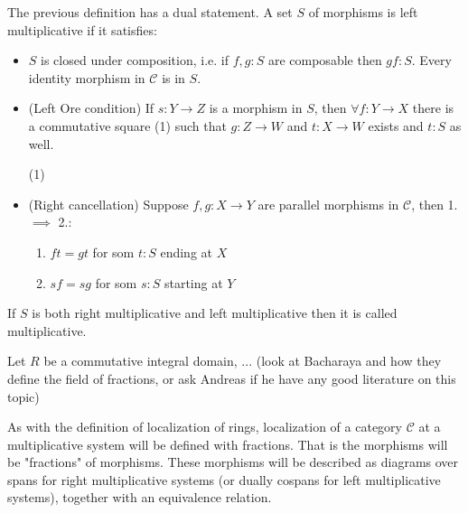     \begin{remark}
        The previous definition has a dual statement. A set $S$ of morphisms is left multiplicative if it satisfies:
        \begin{itemize}
            \item $S$ is closed under composition, i.e. if $f,g : S$ are composable then $gf : S$. Every identity morphism in $\mathcal{C}$ is in $S$.
            \item (Left Ore condition) If $s : Y \rightarrow Z$ is a morphism in $S$, then $\forall f:Y\rightarrow X$ there is a commutative square (1) such that $g:Z\rightarrow W$ and $t:X\rightarrow W$ exists and $t:S$ as well.
            \begin{center}
                (1)
            \end{center}
            \item (Right cancellation) Suppose $f,g:X\rightarrow Y$ are parallel morphisms in $\mathcal{C}$, then 1. $\implies$ 2.:
            \begin{enumerate}
                \item $ft = gt$ for som $t:S$ ending at $X$
                \item $sf = sg$ for som $s:S$ starting at $Y$
            \end{enumerate}
        \end{itemize}
        If $S$ is both right multiplicative and left multiplicative then it is called multiplicative.
    \end{remark}

    \begin{prototype}
         Let $R$ be a commutative integral domain, ... (look at Bacharaya and how they define the field of fractions, or ask Andreas if he have any good literature on this topic)
    \end{prototype}

    As with the definition of localization of rings, localization of a category $\mathcal{C}$ at a multiplicative system will be defined with fractions. That is the morphisms will be "fractions" of morphisms. These morphisms will be described as diagrams over spans for right multiplicative systems (or dually cospans for left multiplicative systems), together with an equivalence relation.

